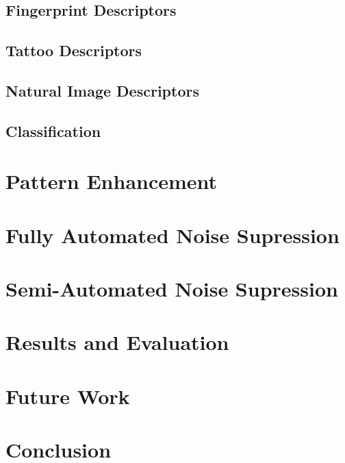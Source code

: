 \documentclass[draft,final]{vutinfth} %
\begin{document}
\section*{Fingerprint Descriptors}

\section*{Tattoo Descriptors}

\section*{Natural Image Descriptors}


\section{Classification}

\chapter{Pattern Enhancement}

\chapter{Fully Automated Noise Supression}

\chapter{Semi-Automated Noise Supression}

\chapter{Results and Evaluation}

\chapter{Future Work}

\chapter{Conclusion}


\backmatter


\cleardoublepage %






\end{document}
